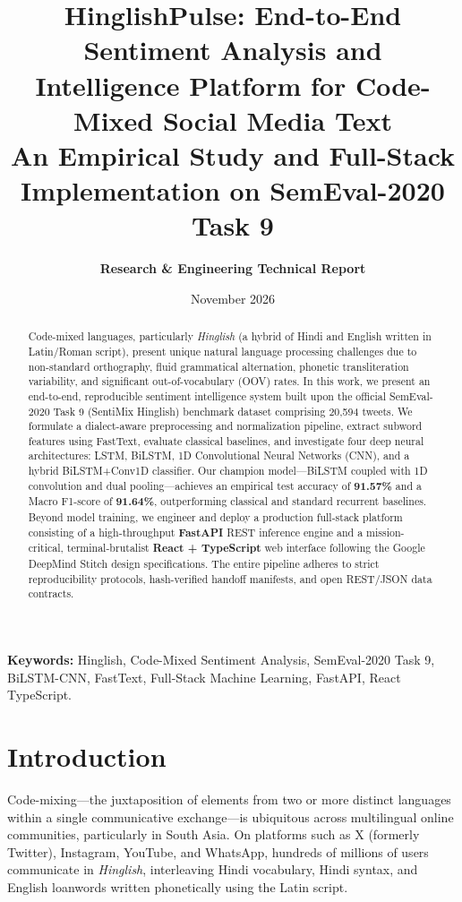 \documentclass[11pt,a4paper]{article}
\title{\textbf{HinglishPulse: End-to-End Sentiment Analysis and Intelligence Platform for Code-Mixed Social Media Text}\\[0.4ex]
\large An Empirical Study and Full-Stack Implementation on SemEval-2020 Task 9}
\author{\textbf{Research \& Engineering Technical Report}}
\date{November 2026}
\begin{document}
\maketitle

\begin{abstract}
Code-mixed languages, particularly \textit{Hinglish} (a hybrid of Hindi and English written in Latin/Roman script), present unique natural language processing challenges due to non-standard orthography, fluid grammatical alternation, phonetic transliteration variability, and significant out-of-vocabulary (OOV) rates. In this work, we present an end-to-end, reproducible sentiment intelligence system built upon the official SemEval-2020 Task 9 (SentiMix Hinglish) benchmark dataset comprising 20,594 tweets. We formulate a dialect-aware preprocessing and normalization pipeline, extract subword features using FastText, evaluate classical baselines, and investigate four deep neural architectures: LSTM, BiLSTM, 1D Convolutional Neural Networks (CNN), and a hybrid BiLSTM+Conv1D classifier. Our champion model—BiLSTM coupled with 1D convolution and dual pooling—achieves an empirical test accuracy of \textbf{91.57\%} and a Macro F1-score of \textbf{91.64\%}, outperforming classical and standard recurrent baselines. Beyond model training, we engineer and deploy a production full-stack platform consisting of a high-throughput \textbf{FastAPI} REST inference engine and a mission-critical, terminal-brutalist \textbf{React + TypeScript} web interface following the Google DeepMind Stitch design specifications. The entire pipeline adheres to strict reproducibility protocols, hash-verified handoff manifests, and open REST/JSON data contracts.
\end{abstract}

\vspace{1em}
\noindent\textbf{Keywords:} Hinglish, Code-Mixed Sentiment Analysis, SemEval-2020 Task 9, BiLSTM-CNN, FastText, Full-Stack Machine Learning, FastAPI, React TypeScript.

\newpage
\tableofcontents
\newpage

\section{Introduction}

Code-mixing—the juxtaposition of elements from two or more distinct languages within a single communicative exchange—is ubiquitous across multilingual online communities, particularly in South Asia. On platforms such as X (formerly Twitter), Instagram, YouTube, and WhatsApp, hundreds of millions of users communicate in \textit{Hinglish}, interleaving Hindi vocabulary, Hindi syntax, and English loanwords written phonetically using the Latin script.
\end{document}
